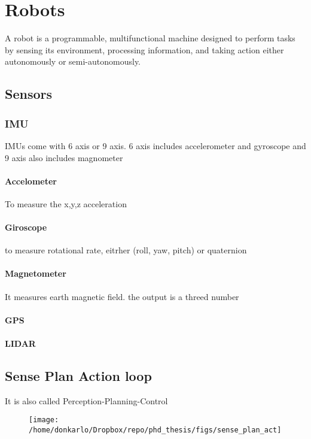 \chapter{Robots}
A robot is a programmable, multifunctional machine designed to perform tasks by sensing its environment, processing information, and taking action either autonomously or semi-autonomously.



\section{Sensors}
    \subsection{IMU}
        IMUs come with 6 axis or 9 axis. 6 axis includes accelerometer and gyroscope and 9 axis also includes magnometer
        
        \subsubsection{Accelometer}
            To measure the x,y,z acceleration
        
        \subsubsection{Giroscope}
            to measure rotational rate, eitrher (roll, yaw, pitch) or quaternion
        
        \subsubsection{Magnetometer}
            It measures earth magnetic field. the output is a threed number
        
        \subsubsection{GPS}
        
        \subsubsection{LIDAR}
        
\section{Sense Plan Action loop}
    It is also called Perception-Planning-Control
    \begin{figure}[H]
        \centering
        \texttt{[image: /home/donkarlo/Dropbox/repo/phd\_thesis/figs/sense\_plan\_act]}
        \label{fig:my_png}
    \end{figure}
    
